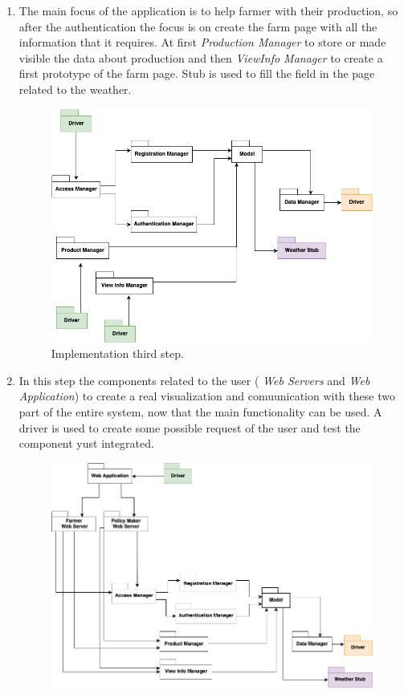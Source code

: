 \begin{enumerate}
\begin{figure}[H]
    \end{figure}
    \item The main focus of the application is to help farmer with their production, so after the authentication the focus is on create the farm page with all the information that it requires. At first \textsl{Production Manager} to store or made visible the data about production and then \textsl{ViewInfo Manager} to create a first prototype of the farm page. Stub is used to fill the field in the page related to the weather.
    \begin{figure}[H]
        \begin{center}
        \includegraphics[width=1\textwidth]{implementation/step3.png}
        \caption{Implementation third step.}
        \label{fig:third step}
        \end{center}
    \end{figure}
    \item In this step the components related to the user ( \textsl{Web Servers} and \textsl{Web Application}) to create a real visualization and comuunication with these two part of the entire system, now that the main functionality can be used. A driver is used to create some possible request of the user and test the component yust integrated.
    \begin{figure}[H]
        \begin{center}
        \includegraphics[width=1\textwidth]{implementation/step4.png}

\end{center}
\end{figure}
\end{enumerate}

